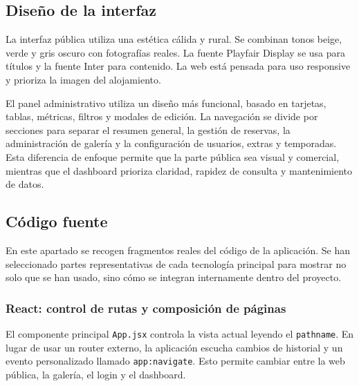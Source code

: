 \documentclass[11pt,a4paper]{article}
\begin{document}
\subsection{Diseño de la interfaz}
La interfaz pública utiliza una estética cálida y rural. Se combinan tonos beige, verde y gris oscuro con fotografías reales. La fuente Playfair Display se usa para títulos y la fuente Inter para contenido. La web está pensada para uso responsive y prioriza la imagen del alojamiento.

El panel administrativo utiliza un diseño más funcional, basado en tarjetas, tablas, métricas, filtros y modales de edición. La navegación se divide por secciones para separar el resumen general, la gestión de reservas, la administración de galería y la configuración de usuarios, extras y temporadas. Esta diferencia de enfoque permite que la parte pública sea visual y comercial, mientras que el dashboard prioriza claridad, rapidez de consulta y mantenimiento de datos.

\subsection{Código fuente}
En este apartado se recogen fragmentos reales del código de la aplicación. Se han seleccionado partes representativas de cada tecnología principal para mostrar no solo que se han usado, sino cómo se integran internamente dentro del proyecto.

\subsubsection{React: control de rutas y composición de páginas}
El componente principal \texttt{App.jsx} controla la vista actual leyendo el \texttt{pathname}. En lugar de usar un router externo, la aplicación escucha cambios de historial y un evento personalizado llamado \texttt{app:navigate}. Esto permite cambiar entre la web pública, la galería, el login y el dashboard.
\end{document}
